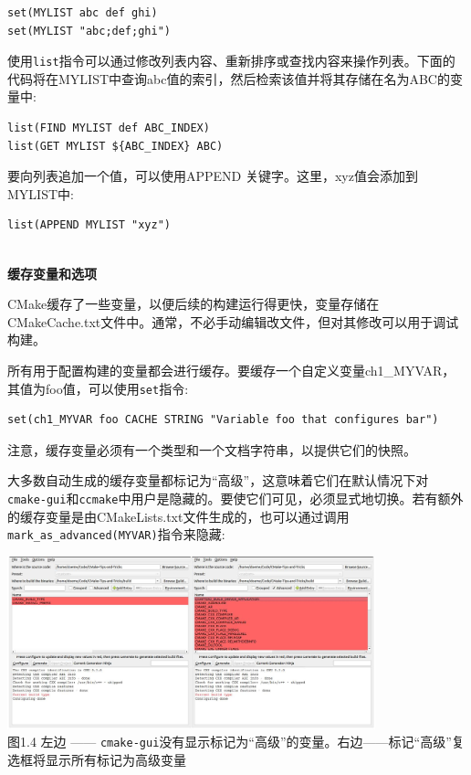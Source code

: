 \begin{lstlisting}[style=styleCMake]
set(MYLIST abc def ghi)
set(MYLIST "abc;def;ghi")
\end{lstlisting}

使用\texttt{list}指令可以通过修改列表内容、重新排序或查找内容来操作列表。下面的代码将在MYLIST中查询abc值的索引，然后检索该值并将其存储在名为ABC的变量中:

\begin{lstlisting}[style=styleCMake]
list(FIND MYLIST def ABC_INDEX) 
list(GET MYLIST ${ABC_INDEX} ABC)
\end{lstlisting}

要向列表追加一个值，可以使用APPEND 关键字。这里，xyz值会添加到MYLIST中:

\begin{lstlisting}[style=styleCMake]
list(APPEND MYLIST "xyz")
\end{lstlisting}

\hspace*{\fill} \\ %
\noindent
\textbf{缓存变量和选项}

CMake缓存了一些变量，以便后续的构建运行得更快，变量存储在CMakeCache.txt文件中。通常，不必手动编辑改文件，但对其修改可以用于调试构建。

所有用于配置构建的变量都会进行缓存。要缓存一个自定义变量ch1\_MYVAR，其值为foo值，可以使用\texttt{set}指令:

\begin{lstlisting}[style=styleCMake]
set(ch1_MYVAR foo CACHE STRING "Variable foo that configures bar")
\end{lstlisting}

注意，缓存变量必须有一个类型和一个文档字符串，以提供它们的快照。

大多数自动生成的缓存变量都标记为“高级”，这意味着它们在默认情况下对\texttt{cmake-gui}和\texttt{ccmake}中用户是隐藏的。要使它们可见，必须显式地切换。若有额外的缓存变量是由CMakeLists.txt文件生成的，也可以通过调用\texttt{mark\_as\_advanced(MYVAR)}指令来隐藏:

\begin{center}
\includegraphics[width=0.8\textwidth]{content/1/chapter1/images/4.jpg}\\
图1.4  左边 —— \texttt{cmake-gui}没有显示标记为“高级”的变量。右边——标记“高级”复选框将显示所有标记为高级变量
\end{center}

